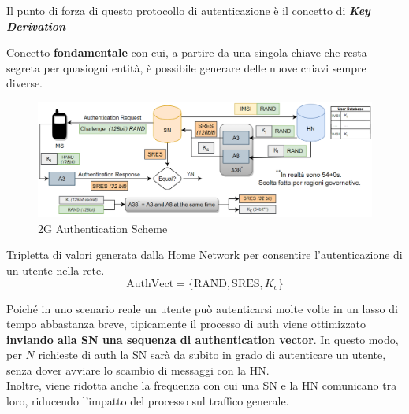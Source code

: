Il punto di forza di questo protocollo di autenticazione è il concetto di \textit{\textbf{Key Derivation}}
\begin{definition}\label{def:keyderiv}
Concetto \textbf{fondamentale} con cui, a partire da una singola chiave che resta segreta per quasi\footnotemark ogni entità, è possibile generare delle nuove chiavi sempre diverse. 
\end{definition}
\begin{figure}[ht]
    \centering
    \includegraphics{image/2gauth.png}
    \caption{2G Authentication Scheme}
    \label{fig:2gauth}
\end{figure}
\begin{corollary}\label{cor:authvect}
Tripletta di valori generata dalla Home Network per consentire l'autenticazione di un utente nella rete.
\begin{equation*}
    \text{AuthVect}=\{\text{RAND}, \text{SRES}, K_c\}
\end{equation*}
\end{corollary}
Poiché in uno scenario reale un utente può autenticarsi molte volte in un lasso di tempo abbastanza breve, tipicamente il processo di auth viene ottimizzato \textbf{inviando alla SN una sequenza di authentication vector}. In questo modo, per $N$ richieste di auth la SN sarà da subito in grado di autenticare un utente, senza dover avviare lo scambio di messaggi con la HN.\\
Inoltre, viene ridotta anche la frequenza con cui una SN e la HN comunicano tra loro, riducendo l'impatto del processo sul traffico generale.

